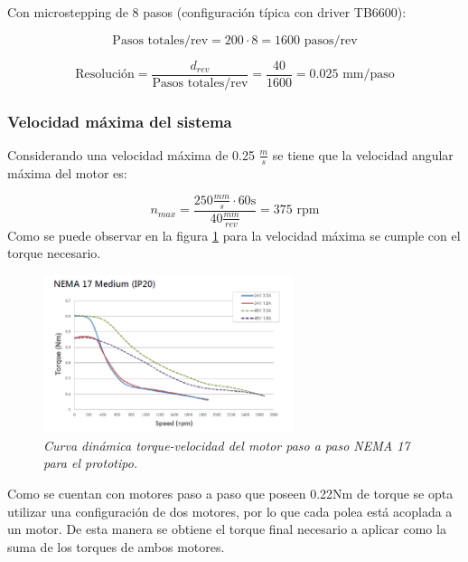 Con microstepping de 8 pasos (configuración típica con driver TB6600):

\begin{equation}
    \text{Pasos totales/rev} = 200 \cdot 8 = 1600 \text{ pasos/rev}
\end{equation}

\begin{equation}
    \text{Resolución} = \frac{d_{rev}}{\text{Pasos totales/rev}} = \frac{40}{1600} = 0.025 \text{ mm/paso}
\end{equation}

\subsubsection{Velocidad máxima del sistema}

Considerando una velocidad máxima de 0.25 \(\frac{m}{s}\) se tiene que la velocidad angular máxima del motor es:

\begin{equation}
    n_{max} = \frac{250 \frac{mm}{s} \cdot 60 \text {s}}{40 \frac{mm}{rev}} = 375 \text{ rpm}
\end{equation}
Como se puede observar en la figura \ref{fig:Curva_din_nema17medium} para la velocidad máxima se cumple con el torque necesario.
\begin{figure}[H]
    \centering
    \includegraphics[width=0.65\textwidth]{img/nema17_medium.png}
    \caption{\textit{Curva dinámica torque-velocidad del motor paso a paso NEMA 17 para el prototipo.}}
    \label{fig:Curva_din_nema17medium}
\end{figure}
Como se cuentan con motores paso a paso que poseen 0.22Nm de torque se opta utilizar una configuración de dos motores, por lo que cada polea está acoplada a un motor. De esta manera se obtiene el torque final necesario a aplicar como la suma de los torques de ambos motores.